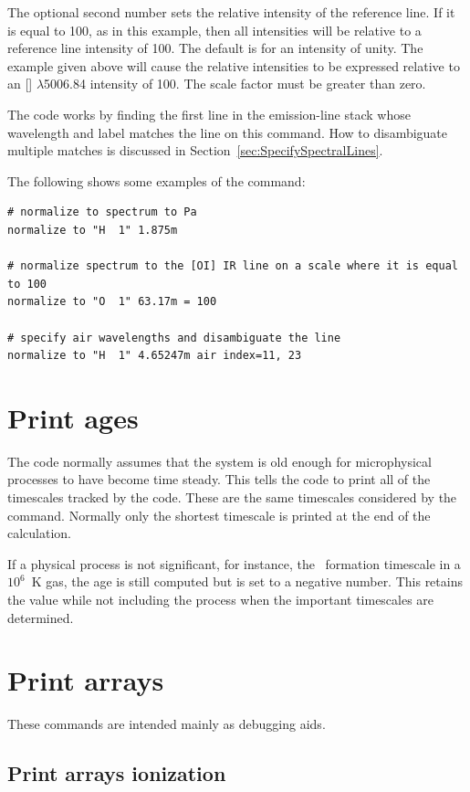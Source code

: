 The optional second number sets the relative intensity of the reference
line.
If it is equal to 100, as in this example, then all intensities will
be relative to a reference line intensity of 100.
The default is for an
intensity of unity.
The example given above will cause the relative
intensities to be expressed relative to an [] $\lambda$5006.84 intensity of 100.
The scale factor must be greater than zero.

The code works by finding the first line in the emission-line stack whose
wavelength and label matches the line on this command.
How to disambiguate multiple matches is discussed in Section~\ref{sec:SpecifySpectralLines}.

The following shows some examples of the  command:
\begin{verbatim}
# normalize to spectrum to Pa
normalize to "H  1" 1.875m

# normalize spectrum to the [OI] IR line on a scale where it is equal to 100
normalize to "O  1" 63.17m = 100

# specify air wavelengths and disambiguate the line
normalize to "H  1" 4.65247m air index=11, 23
\end{verbatim}

\section{Print ages}

The code normally assumes that the system is old enough for microphysical
processes to have become time steady.  This tells the code to print all
of the timescales tracked by the code.
These are the same timescales
considered by the  command.
Normally only
the shortest timescale is printed at the end of the calculation.

If a physical process is not significant, for instance, the \htwo\ formation
timescale in a $10^6$~K gas,
the age is still computed but is set to a negative
number.
This retains the value while not including the process when the
important timescales are determined.


\section{Print arrays}

These commands are intended mainly as debugging aids.

\subsection{Print arrays ionization}

